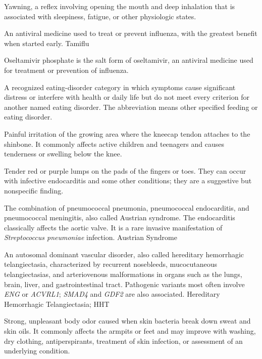  Yawning, a reflex involving opening the mouth and deep inhalation that is associated with sleepiness, fatigue, or other physiologic states.

 An antiviral medicine used to treat or prevent influenza, with the greatest benefit when started early.
\synonyms
Tamiflu

 Oseltamivir phosphate is the salt form of oseltamivir, an antiviral medicine used for treatment or prevention of influenza.

 A recognized eating-disorder category in which symptoms cause significant distress or interfere with health or daily life but do not meet every criterion for another named eating disorder. The abbreviation means other specified feeding or eating disorder.

 Painful irritation of the growing area where the kneecap tendon attaches to the shinbone. It commonly affects active children and teenagers and causes tenderness or swelling below the knee.

 Tender red or purple lumps on the pads of the fingers or toes. They can occur with infective endocarditis and some other conditions; they are a suggestive but nonspecific finding.

 The combination of pneumococcal pneumonia, pneumococcal
endocarditis, and pneumococcal meningitis, also called Austrian syndrome. The
endocarditis classically affects the aortic valve. It is a rare invasive
manifestation of \textit{Streptococcus pneumoniae} infection.
\synonyms
Austrian Syndrome

 An autosomal dominant vascular disorder, also
called hereditary hemorrhagic telangiectasia, characterized by recurrent nosebleeds,
mucocutaneous telangiectasias, and arteriovenous malformations in organs such as the
lungs, brain, liver, and gastrointestinal tract. Pathogenic variants most often
involve \textit{ENG} or \textit{ACVRL1}; \textit{SMAD4} and \textit{GDF2} are also
associated.
\synonyms
Hereditary Hemorrhagic Telangiectasia; HHT

 Strong, unpleasant body odor caused when skin bacteria break down sweat and skin oils. It commonly affects the armpits or feet and may improve with washing, dry clothing, antiperspirants, treatment of skin infection, or assessment of an underlying condition.

